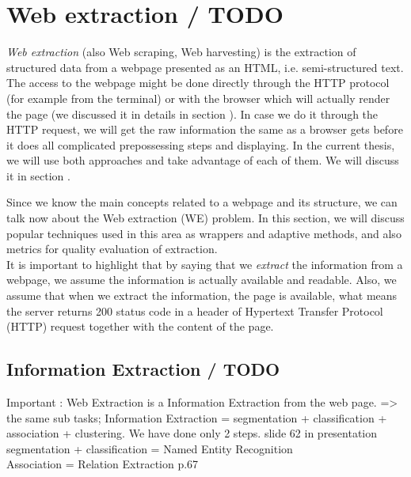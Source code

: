 \chapter{Web extraction / TODO}

\textit{Web extraction} (also Web scraping, Web harvesting) is the extraction of structured data from a webpage presented as an HTML, i.e. semi-structured text. The access to the webpage might be done directly through the HTTP protocol (for example from the terminal) or with the browser which will actually render the page (we discussed it in details in section ). In case we do it through the HTTP request, we will get the raw information the same as a browser gets before it does all complicated prepossessing steps and displaying. In the current thesis, we will use both approaches and take advantage of each of them. We will discuss it in section .

Since we know the main concepts related to a webpage and its structure, we can talk now about the Web extraction (WE) problem. In this section, we will discuss popular techniques used in this area as wrappers and adaptive methods, and also metrics for quality evaluation of extraction.\\  

It is important to highlight that by saying that we \textit{extract} the information from a webpage, we assume the information is actually available and readable. Also, we assume that when we extract the information, the page is available, what means the server returns 200 status code in a header of Hypertext Transfer Protocol (HTTP) request together with the content of the page.\\


\section{Information Extraction / TODO}

Important : Web Extraction is a Information Extraction from the web page. => the same sub tasks; Information Extraction = segmentation + classification + association + clustering. We have done only 2 steps. slide 62 in presentation \\

segmentation + classification = Named Entity Recognition\\
Association = Relation Extraction p.67\\



